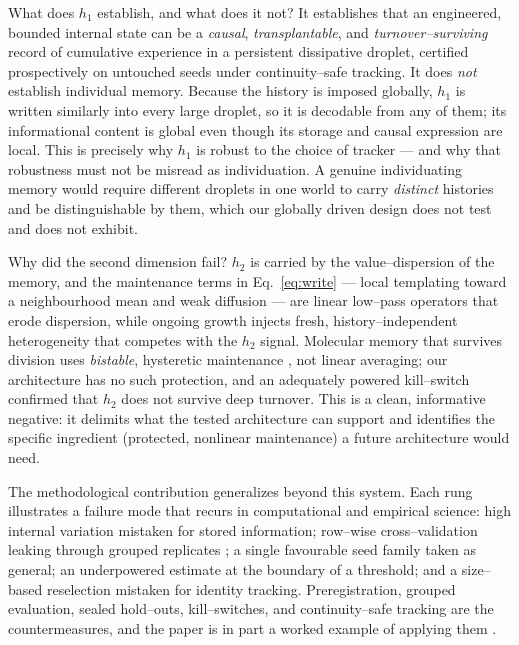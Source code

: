 \documentclass[11pt]{article}
\begin{document}
What does $h_1$ establish, and what does it not? It establishes that an engineered, bounded internal state can be a
\emph{causal}, \emph{transplantable}, and \emph{turnover--surviving} record of cumulative experience in a persistent
dissipative droplet, certified prospectively on untouched seeds under continuity--safe tracking. It does \emph{not}
establish individual memory. Because the history is imposed globally, $h_1$ is written similarly into every large
droplet, so it is decodable from any of them; its informational content is global even though its storage and causal
expression are local. This is precisely why $h_1$ is robust to the choice of tracker --- and why that robustness
must not be misread as individuation. A genuine individuating memory would require different droplets in one world
to carry \emph{distinct} histories and be distinguishable by them, which our globally driven design does not test
and does not exhibit.

Why did the second dimension fail? $h_2$ is carried by the value--dispersion of the memory, and the maintenance
terms in Eq.~\eqref{eq:write} --- local templating toward a neighbourhood mean and weak diffusion --- are linear
low--pass operators that erode dispersion, while ongoing growth injects fresh, history--independent heterogeneity
that competes with the $h_2$ signal. Molecular memory that survives division uses \emph{bistable}, hysteretic
maintenance \citep{gardner2000,elowitz2000,ferrell2002,ptashne2004}, not linear averaging; our architecture has no
such protection, and an adequately powered kill--switch confirmed that $h_2$ does not survive deep turnover. This is
a clean, informative negative: it delimits what the tested architecture can support and identifies the specific
ingredient (protected, nonlinear maintenance) a future architecture would need.

The methodological contribution generalizes beyond this system. Each rung illustrates a failure mode that recurs in
computational and empirical science: high internal variation mistaken for stored information; row--wise
cross--validation leaking through grouped replicates \citep{kaufman2012}; a single favourable seed family taken as
general; an underpowered estimate at the boundary of a threshold; and a size--based reselection mistaken for
identity tracking. Preregistration, grouped evaluation, sealed hold--outs, kill--switches, and continuity--safe
tracking are the countermeasures, and the paper is in part a worked example of applying them
\citep{nosek2018,popper1959,efron1979}.
\end{document}
